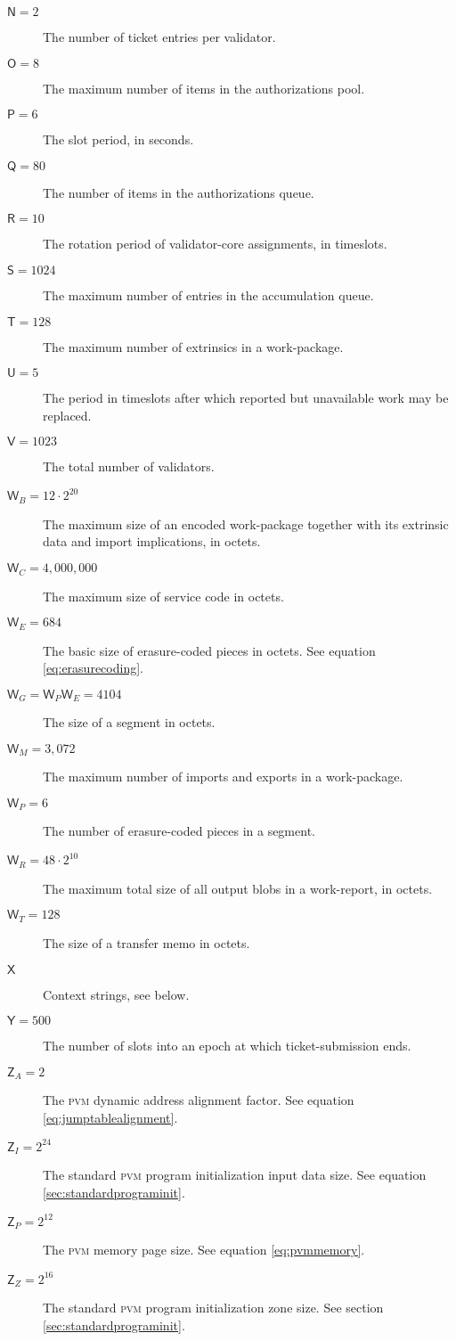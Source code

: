 \begin{description}
  \item[$\mathsf{N} = 2$] The number of ticket entries per validator.
  \item[$\mathsf{O} = 8$] The maximum number of items in the authorizations pool.
  \item[$\mathsf{P} = 6$] The slot period, in seconds.
  \item[$\mathsf{Q} = 80$] The number of items in the authorizations queue.
  \item[$\mathsf{R} = 10$] The rotation period of validator-core assignments, in timeslots.
  \item[$\mathsf{S} = 1024$] The maximum number of entries in the accumulation queue.
  \item[$\mathsf{T} = 128$] The maximum number of extrinsics in a work-package.
  \item[$\mathsf{U} = 5$] The period in timeslots after which reported but unavailable work may be replaced.
  \item[$\mathsf{V} = 1023$] The total number of validators.
  \item[$\mathsf{W}_B = 12\cdot2^{20}$] The maximum size of an encoded work-package together with its extrinsic data and import implications, in octets.
  \item[$\mathsf{W}_C = 4,000,000$] The maximum size of service code in octets.
  \item[$\mathsf{W}_E = 684$] The basic size of erasure-coded pieces in octets. See equation \ref{eq:erasurecoding}.
  \item[$\mathsf{W}_G = \mathsf{W}_P\mathsf{W}_E = 4104$] The size of a segment in octets.
  \item[$\mathsf{W}_M = 3,072$] The maximum number of imports and exports in a work-package.
  \item[$\mathsf{W}_P = 6$] The number of erasure-coded pieces in a segment.
  \item[$\mathsf{W}_R = 48\cdot2^{10}$] The maximum total size of all output blobs in a work-report, in octets.
  \item[$\mathsf{W}_T = 128$] The size of a transfer memo in octets.
  \item[$\mathsf{X}$] Context strings, see below.
  \item[$\mathsf{Y} = 500$] The number of slots into an epoch at which ticket-submission ends.
  \item[$\mathsf{Z}_A = 2$] The \textsc{pvm} dynamic address alignment factor. See equation \ref{eq:jumptablealignment}.
  \item[$\mathsf{Z}_I = 2^{24}$] The standard \textsc{pvm} program initialization input data size. See equation \ref{sec:standardprograminit}.
  \item[$\mathsf{Z}_P = 2^{12}$] The \textsc{pvm} memory page size. See equation \ref{eq:pvmmemory}.
  \item[$\mathsf{Z}_Z = 2^{16}$] The standard \textsc{pvm} program initialization zone size. See section \ref{sec:standardprograminit}.
\end{description}

